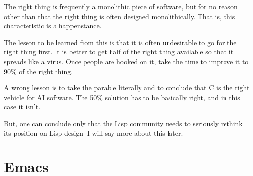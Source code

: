 \documentclass[10pt,twoside,openright]{memoir}
\begin{document}
The right thing is frequently a monolithic piece of software, but for no reason other than that the right thing is often designed monolithically. That is, this characteristic is a happenstance.

The lesson to be learned from this is that it is often undesirable to go for the right thing first. It is better to get half of the right thing available so that it spreads like a virus. Once people are hooked on it, take the time to improve it to 90\% of the right thing.

A wrong lesson is to take the parable literally and to conclude that C is the right vehicle for AI software. The 50\% solution has to be basically right, and in this case it isn't.

But, one can conclude only that the Lisp community needs to seriously rethink its position on Lisp design. I will say more about this later.


\chapter{Emacs}
\end{document}
